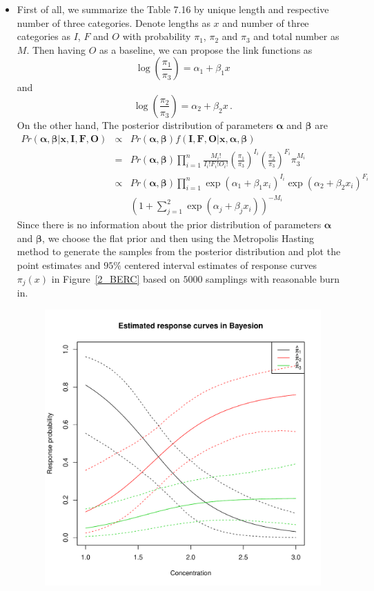\documentclass[]{article}
\begin{document}
\begin{enumerate}
{        \item[Sol 2]
        \begin{itemize}
        	\item[(a)]
        	First of all, we summarize the Table 7.16 by unique length and respective number of three categories. Denote lengths as $x$ and number of three categories as $I$, $F$ and $O$ with probability $\pi_1$, $\pi_2$ and $\pi_3$ and total number as $M$. Then having $O$ as a baseline, we can propose the link functions as 
        	$$\log(\frac{\pi_1}{\pi_3}) = \alpha_1 + \beta_1 x$$
        	and 
        	$$\log(\frac{\pi_2}{\pi_3}) = \alpha_2 + \beta_2 x\,.$$
        	On the other hand, The posterior distribution of parameters $\bm \alpha$ and $\bm \beta$ are
        	\begin{eqnarray}
        	Pr(\bm \alpha, \bm \beta| \bm x, \bm I, \bm F, \bm O) & \propto & Pr(\bm \alpha, \bm \beta) f(\bm I, \bm F, \bm O | \bm x, \bm \alpha, \bm \beta)\\
        	& = & Pr(\bm \alpha, \bm \beta) \prod_{i = 1}^{n}\frac{M_i!}{I_i!F_i!O_i!}(\frac{\pi_1}{\pi_3})^{I_i}(\frac{\pi_2}{\pi_3})^{F_i}\pi_3^{M_i}\\
        	& \propto & Pr(\bm \alpha, \bm \beta) \prod_{i=1}^{n} \exp(\alpha_1 + \beta_1 x_i)^{I_i}\exp(\alpha_2 + \beta_2 x_i)^{F_i}\\
        	& & (1+\sum_{j = 1}^{2}\exp(\alpha_j + \beta_j x_i))^{-M_i} 
        	\end{eqnarray}
        	Since there is no information about the prior distribution of parameters $\bm \alpha$ and $\bm \beta$, we choose the flat prior and then using the Metropolis Hasting method to generate the samples from the posterior distribution and plot the point estimates and $95\%$ centered interval estimates of response curves $\pi_j(x)$ in Figure~\ref{2_BERC} based on $5000$ samplings with reasonable burn in.\\
        	\begin{figure}[ht!]
        		\centering
        		\includegraphics[scale = 0.5]{"pic/HW4_2/BERC"}

\end{figure}
\end{itemize}}
\end{enumerate}
\end{document}
